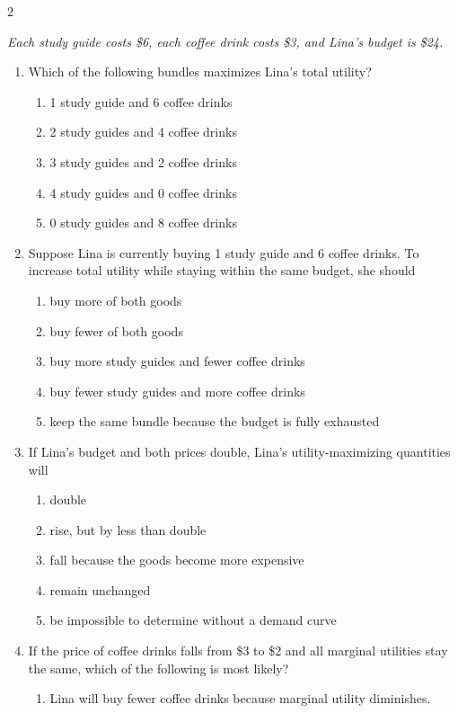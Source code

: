 \documentclass[10pt]{article}
\newenvironment{choiceslist}
  {\begin{enumerate}[label=(\Alph*), leftmargin=1.6em, itemsep=0.12em, topsep=0.18em, parsep=0pt]}
  {\end{enumerate}}
\newenvironment{stimulus}
  {\begin{center}\begin{minipage}{0.96\columnwidth}\footnotesize\itshape\setlength{\tabcolsep}{3pt}\renewcommand{\arraystretch}{0.96}}
  {\end{minipage}\end{center}}
\begin{document}
\begin{multicols*}{2}
\begin{stimulus}
Each study guide costs \$6, each coffee drink costs \$3, and Lina's budget is \$24.
\end{stimulus}
\begin{enumerate}[resume*=apq, leftmargin=*, itemsep=0.85em, topsep=0.2em, parsep=0pt]
\item Which of the following bundles maximizes Lina's total utility?
\begin{choiceslist}
\item 1 study guide and 6 coffee drinks
\item 2 study guides and 4 coffee drinks
\item 3 study guides and 2 coffee drinks
\item 4 study guides and 0 coffee drinks
\item 0 study guides and 8 coffee drinks
\end{choiceslist}
\item Suppose Lina is currently buying 1 study guide and 6 coffee drinks. To increase total utility while staying within the same budget, she should
\begin{choiceslist}
\item buy more of both goods
\item buy fewer of both goods
\item buy more study guides and fewer coffee drinks
\item buy fewer study guides and more coffee drinks
\item keep the same bundle because the budget is fully exhausted
\end{choiceslist}
\item If Lina's budget and both prices double, Lina's utility-maximizing quantities will
\begin{choiceslist}
\item double
\item rise, but by less than double
\item fall because the goods become more expensive
\item remain unchanged
\item be impossible to determine without a demand curve
\end{choiceslist}
\item If the price of coffee drinks falls from \$3 to \$2 and all marginal utilities stay the same, which of the following is most likely?
\begin{choiceslist}
\item Lina will buy fewer coffee drinks because marginal utility diminishes.

\end{choiceslist}
\end{enumerate}
\end{multicols*}
\end{document}
